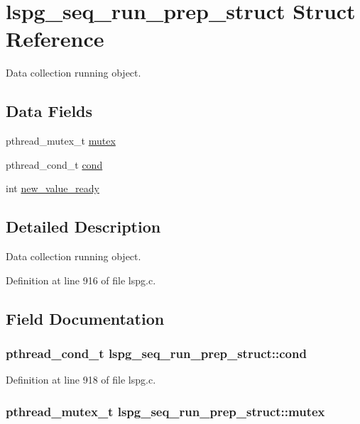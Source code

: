 \hypertarget{structlspg__seq__run__prep__struct}{
\section{lspg\_\-seq\_\-run\_\-prep\_\-struct Struct Reference}
\label{structlspg__seq__run__prep__struct}
}


Data collection running object.  
\subsection*{Data Fields}
\begin{DoxyCompactItemize}
\item 
pthread\_\-mutex\_\-t \hyperlink{structlspg__seq__run__prep__struct_ad146cb91b5f7dd8bb283092c28781fe7}{mutex}
\item 
pthread\_\-cond\_\-t \hyperlink{structlspg__seq__run__prep__struct_acd83ea6994f57377716ff01c8ee7ce43}{cond}
\item 
int \hyperlink{structlspg__seq__run__prep__struct_a42d08888327e9059ddd69ddfec31b8a9}{new\_\-value\_\-ready}
\end{DoxyCompactItemize}


\subsection{Detailed Description}
Data collection running object. 

Definition at line 916 of file lspg.c.

\subsection{Field Documentation}
\hypertarget{structlspg__seq__run__prep__struct_acd83ea6994f57377716ff01c8ee7ce43}{
\subsubsection[{cond}]{\setlength{\rightskip}{0pt plus 5cm}pthread\_\-cond\_\-t {\bf lspg\_\-seq\_\-run\_\-prep\_\-struct::cond}}}
\label{structlspg__seq__run__prep__struct_acd83ea6994f57377716ff01c8ee7ce43}


Definition at line 918 of file lspg.c.\hypertarget{structlspg__seq__run__prep__struct_ad146cb91b5f7dd8bb283092c28781fe7}{
\subsubsection[{mutex}]{\setlength{\rightskip}{0pt plus 5cm}pthread\_\-mutex\_\-t {\bf lspg\_\-seq\_\-run\_\-prep\_\-struct::mutex}}}
\label{structlspg__seq__run__prep__struct_ad146cb91b5f7dd8bb283092c28781fe7}


